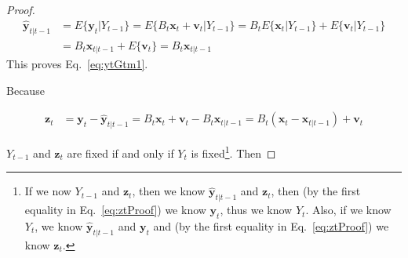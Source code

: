 \documentclass[12pt]{article}
\begin{document}
\begin{proof}
    \begin{align}
        \hat{\mathbf{y}}_{t|t-1}&=E\{\mathbf{y}_t|Y_{t-1}\}=E\{B_t\mathbf{x}_t+\mathbf{v}_t|Y_{t-1}\}=B_tE\{\mathbf{x}_t|Y_{t-1}\}+E\{\mathbf{v}_t|Y_{t-1}\}\nonumber\\
                                &=B_t\mathbf{x}_{t|t-1}+E\{\mathbf{v}_t\}=B_t\mathbf{x}_{t|t-1}\nonumber
    \end{align}
	This proves Eq.~\ref{eq:ytGtm1}.

    Because

    \begin{align}
        \mathbf{z}_t&=\mathbf{y}_t-\hat{\mathbf{y}}_{t|t-1}=B_t\mathbf{x}_t+\mathbf{v}_t-B_t\mathbf{x}_{t|t-1}=B_t(\mathbf{x}_t-\mathbf{x}_{t|t-1})+\mathbf{v}_t\label{eq:ztProof}
    \end{align}

    \noindent $Y_{t-1}$ and $\mathbf{z}_t$ are fixed if and only if $Y_t$ is
    fixed\footnote{If we now $Y_{t-1}$ and $\mathbf{z}_t$, then we know
    $\hat{\mathbf{y}}_{t|t-1}$ and $\mathbf{z}_t$, then (by the first equality
    in Eq.~\ref{eq:ztProof}) we know $\mathbf{y}_t$, thus we know $Y_t$. Also, if we
    know $Y_t$, we know $\hat{\mathbf{y}}_{t|t-1}$ and $\mathbf{y}_t$ and (by
    the first equality in Eq.~\ref{eq:ztProof}) we know $\mathbf{z}_t$.}. Then


\end{proof}
\end{document}
